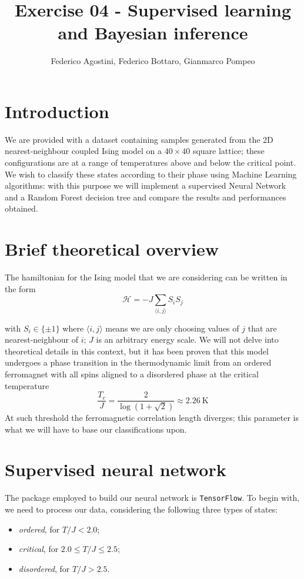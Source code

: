 \documentclass[a4paper,11pt]{article}
\title{Exercise 04 - Supervised learning and Bayesian inference}
\author{Federico Agostini, Federico Bottaro, Gianmarco Pompeo}
\date{}
\begin{document}
\maketitle


\section{Introduction}
We are provided with a dataset containing samples generated from the 2D nearest-neighbour coupled Ising model on a $40 \times 40$ square lattice; these configurations are at a range of temperatures above and below the critical point.
\\
We wish to classify these states according to their phase using Machine Learning algorithms: with this purpose we will implement a supervised Neural Network and a Random Forest decision tree and compare the results and performances obtained. 


\section{Brief theoretical overview}
The hamiltonian for the Ising model that we are considering can be written in the form
\begin{equation}
    \mathcal{H} = -J \sum_{\langle i,j \rangle} S_i S_j
\end{equation}

with $S_i \in \{\pm 1\}$ where $\langle i,j \rangle$ means we are only choosing values of $j$ that are nearest-neighbour of $i$; $J$ is an arbitrary energy scale. We will not delve into theoretical details in this context, but it has been proven that this model undergoes a phase transition in the thermodynamic limit from an ordered ferromagnet with all spins aligned to a disordered phase at the critical temperature
\begin{equation}
    \frac{T_c}{J} = \frac{2}{\log(1+\sqrt{2})} \approx 2.26 \ \mathrm{K}
\end{equation}
At such threshold the ferromagnetic correlation length diverges; this parameter is what we will have to base our classifications upon. 

 

\section{Supervised neural network}
The package employed to build our neural network is \texttt{TensorFlow}. To begin with, we need to process our data, considering the following three types of states:
\begin{itemize}
    \item \emph{ordered}, for $T/J<2.0$;
    \item \emph{critical}, for $2.0 \le T/J \le 2.5$;
    \item \emph{disordered}, for $T/J > 2.5$. 
\end{itemize}
\end{document}

